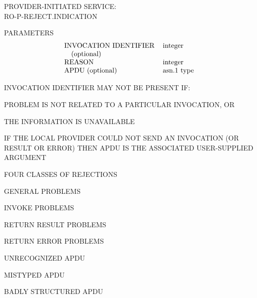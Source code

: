 \begin{bwslide}

\begin{nrtc}
\item	PROVIDER-INITIATED SERVICE:\\ RO-P-REJECT.INDICATION

\item	PARAMETERS
\[\begin{tabular}{ll}
    INVOCATION IDENTIFIER&	integer\\
    \ \ \ (optional)&		\\
    REASON&			integer\\
    APDU (optional)&		asn.1 type\\
\end{tabular}\]

\item	INVOCATION IDENTIFIER MAY NOT BE PRESENT IF:
    \begin{nrtc}
    \item	PROBLEM IS NOT RELATED TO A PARTICULAR INVOCATION, OR

    \item	THE INFORMATION IS UNAVAILABLE
    \end{nrtc}

\item	IF THE LOCAL PROVIDER COULD NOT SEND AN INVOCATION (OR RESULT OR ERROR)
	THEN APDU IS THE ASSOCIATED USER-SUPPLIED ARGUMENT
\end{nrtc}
\end{bwslide}


\begin{bwslide}

\begin{nrtc}
\item	FOUR CLASSES OF REJECTIONS
    \begin{nrtc}
    \item	GENERAL PROBLEMS

    \item	INVOKE PROBLEMS

    \item	RETURN RESULT PROBLEMS

    \item	RETURN ERROR PROBLEMS
    \end{nrtc}
\end{nrtc}
\end{bwslide}


\begin{bwslide}

\begin{nrtc}
\item	UNRECOGNIZED APDU

\item	MISTYPED APDU

\item	BADLY STRUCTURED APDU   
\end{nrtc}
\end{bwslide}


